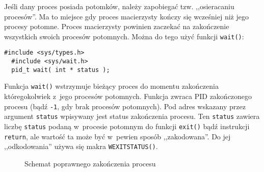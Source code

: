 Jeśli dany proces posiada potomków, należy zapobiegać tzw. ,,osieracaniu
procesów''. Ma to miejsce gdy proces macierzysty kończy się wcześniej niż jego
procesy potomne. Proces macierzysty powinien zaczekać na zakończenie wszystkich
swoich procesów potomnych. Można do tego użyć funkcji \texttt{wait()}:
\begin{lstlisting}[style=MyCStyle]
  #include <sys/types.h>
  #include <sys/wait.h>
  pid_t wait( int * status );
\end{lstlisting}
Funkcja \texttt{wait()} wstrzymuje bieżący proces do momentu zakończenia
któregokolwiek z~jego procesów potomnych. Funkcja zwraca PID zakończonego
procesu (bądź \texttt{-1}, gdy brak procesów potomnych). Pod adres wskazany
przez argument \texttt{status} wpisywany jest status zakończenia procesu. Ten
\texttt{status} zawiera liczbę \texttt{status} podaną w~procesie potomnym do
funkcji \texttt{exit()} bądź instrukcji \texttt{return}, ale wartość ta może
być w~pewien sposób ,,zakodowana''. Do jej ,,odkodowania'' używa się makra
\texttt{WEXITSTATUS()}.

\begin{figure}
  \centering
  \caption{Schemat poprawnego zakończenia procesu}
  \label{fig:Z6B8G}
\end{figure}

